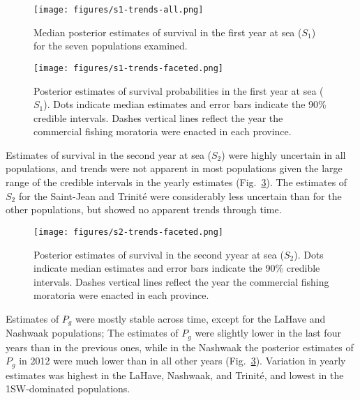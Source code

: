 \documentclass[12pt]{article}
\newcommand{\So}{$S_{1}$\xspace}
\newcommand{\St}{$S_{2}$\xspace}
\newcommand{\Pg}{$P_g$\xspace}
\begin{document}

\begin{figure}[htbp] \centering
    \texttt{[image: figures/s1-trends-all.png]}
    \caption{Median posterior estimates of survival in the first year at sea (\So) 
        for the seven populations examined.} \label{fig:s1-dual} 
\end{figure}


\begin{figure}[htbp] \centering
    \texttt{[image: figures/s1-trends-faceted.png]}
    \caption{Posterior estimates of survival probabilities in the first year at sea (\So). Dots indicate median estimates and error
        bars indicate the 90\% credible intervals. Dashes vertical lines reflect the year the commercial fishing moratoria were enacted
    in each province.} \label{fig:s1-faceted}
\end{figure}

Estimates of survival in the second year at sea (\St) were highly uncertain in all populations, and trends 
were not apparent in most populations given the large range of the credible
intervals in the yearly estimates (Fig.~\ref{fig:s2-faceted}). The estimates
of \St for the Saint-Jean and Trinit\'{e} were considerably less uncertain
than for the other populations, but showed no apparent trends through time.

\begin{figure}[htbp] \centering
    \texttt{[image: figures/s2-trends-faceted.png]}
    \caption{Posterior estimates of survival in the second yyear at sea (\St).
 Dots indicate median estimates and error bars indicate the 90\% credible
 intervals. Dashes vertical lines reflect the year the commercial fishing
 moratoria were enacted in each province.} \label{fig:s2-faceted}
\end{figure}

Estimates of \Pg were mostly stable across time, except for the LaHave and
Nashwaak populations; The estimates of \Pg were slightly lower in the last four
years than in the previous ones, while in the Nashwaak the posterior estimates
of \Pg in 2012 were much lower than in all other years
(Fig.~\ref{fig:s2-faceted}). Variation in yearly estimates was highest in
the LaHave, Nashwaak, and Trinit\'{e}, and lowest in the 1SW-dominated
populations.
\end{document}
